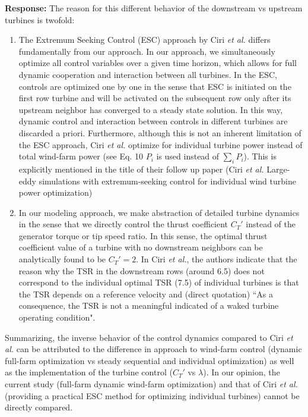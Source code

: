 \documentclass[]{article}
\begin{document}
\textbf{Response:} The reason for this different behavior of the downstream vs upstream turbines is twofold:
\begin{enumerate}
	\item The Extremum Seeking Control (ESC) approach by Ciri \emph{et al.} differs fundamentally from our approach. In our approach, we simultaneously optimize all control variables over a given time horizon, which allows for full dynamic cooperation and interaction between all turbines. In the ESC, controls are optimized one by one in the sense that ESC is initiated on the first row turbine and will be activated on the subsequent row only after its upstream neighbor has converged to a steady state solution. In this way, dynamic control and interaction between controls in different turbines are discarded a priori. Furthermore, although this is not an inherent limitation of the ESC approach, Ciri \emph{et al.} optimize for individual turbine power instead of total wind-farm power (see Eq. 10 $P_i$ is used instead of $\sum_i P_i$). This is explicitly mentioned in the title of their follow up paper (Ciri \emph{et al.} Large-eddy simulations with extremum-seeking control for individual wind turbine power optimization)
	
	\item In our modeling approach, we make abstraction of detailed turbine dynamics in the sense that we directly control the thrust coefficient $C_T'$ instead of the generator torque or tip speed ratio. In this sense, the optimal thrust coefficient value of a turbine with no downstream neighbors can be analytically found to be $C_T' = 2$. In Ciri \emph{et al.}, the authors indicate that the reason why the TSR in the downstream rows (around 6.5) does not correspond to the individual optimal TSR (7.5) of individual turbines is that the TSR depends on a reference velocity and (direct quotation) ``As a consequence, the TSR is not a meaningful indicated of a waked turbine operating condition". 
	
\end{enumerate}

Summarizing, the inverse behavior of the control dynamics compared to Ciri \emph{et al.} can be attributed to the difference in approach to wind-farm control (dynamic full-farm optimization vs steady sequential and individual optimization) as well as the implementation of the turbine control ($C_T'$ vs $\lambda$). In our opinion, the current study (full-farm dynamic wind-farm optimization) and that of Ciri \emph{et al.} (providing a practical ESC method for optimizing individual turbines) cannot be directly compared. 
\end{document}
